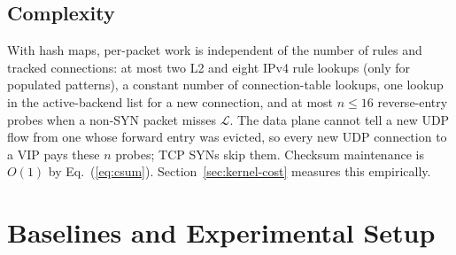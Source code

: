 \documentclass[conference]{IEEEtran}
\begin{document}
\subsection{Complexity}
\label{sec:complexity}
With hash maps, per-packet work is independent of the number of rules and
tracked connections: at most two L2 and eight IPv4 rule lookups (only for
populated patterns), a constant number of connection-table lookups, one
lookup in the active-backend list for a new connection, and at most $n \le 16$
reverse-entry probes when a non-SYN packet misses $\mathcal{L}$. The data
plane cannot tell a new UDP flow from one whose forward entry was evicted, so
every new UDP connection to a VIP pays these $n$ probes; TCP SYNs skip them. Checksum
maintenance is $O(1)$ by Eq.~(\ref{eq:csum}). Section~\ref{sec:kernel-cost}
measures this empirically.

\section{Baselines and Experimental Setup}
\label{sec:setup}
\end{document}
